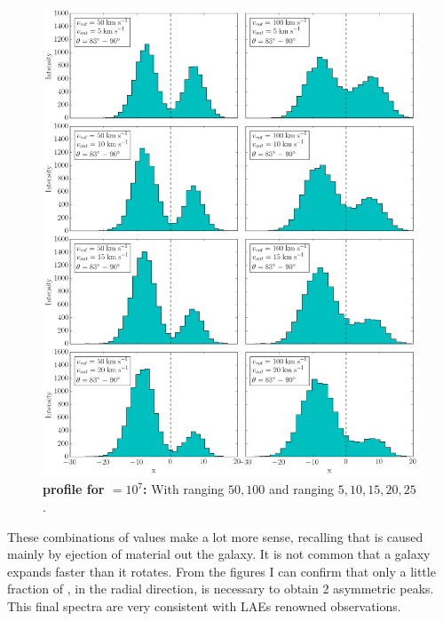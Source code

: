 \begin{figure}[h!]
	\begin{center}
		\includegraphics[width=1\textwidth]{./figures/chapter3/3_tau10E6_phi83-90}
	\end{center}
	\caption{\textbf{\lya profile for \tauh$=10^7$:} With \vrot ranging $50,100$ \kms and \vout ranging $5,10,15,20,25$ \kms.
		\label{fig:3_tau10E7_phi83-90}}
\end{figure}

These combinations of values make a lot more sense, recalling that \vout is caused mainly by ejection of material out the galaxy. It is not common that a galaxy expands faster than it rotates. From the figures I can confirm that only a little fraction of \vrot, in the radial direction, is necessary to obtain 2 asymmetric peaks. This final spectra are very consistent with LAEs renowned observations.  \\









